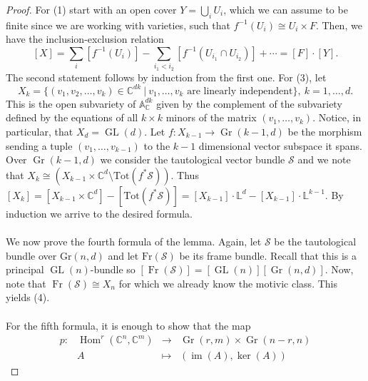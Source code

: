 \documentclass{amsart}
\theoremstyle{plain}
\numberwithin{equation}{section}
\theoremstyle{definition}
\theoremstyle{remark}
\begin{document}
	\begin{proof}
		For (1) start with an open cover $Y=\bigcup_{i}U_i$, which we can assume to be finite since we are working with varieties, such that $f^{-1}(U_i)\cong U_i\times F$. Then, we have the inclusion-exclusion relation
		$$
		[X]=\sum_{i}[f^{-1}(U_i)]-\sum_{i_1<i_2}[f^{-1}(U_{i_1}\cap U_{i_2})]+\cdots=[F]\cdot [Y].
		$$
		The second statement follows by induction from the first one. For (3), let 
		$$
		X_k=\{(v_1,v_2,\ldots,v_k)\in \mathbb{C}^{dk}\ | \ v_1,\ldots,v_k \text{ are linearly independent} \}, \ k=1,\ldots,d.
		$$
		This is the open subvariety of $\mathbb{A}^{dk}_{\mathbb{C}}$ given by the complement of the subvariety defined by the equations of all $k\times k $ minors of the matrix $(v_1,\ldots,v_k)$. Notice, in particular, that $X_d=\operatorname{GL}(d)$. Let $f:X_{k-1}\to \operatorname{Gr}(k-1,d)$ be the morphism sending a tuple $(v_1,\ldots,v_{k-1})$ to the $k-1$ dimensional vector subspace it spans.  Over $\operatorname{Gr}(k-1,d)$ we consider the tautological vector bundle $\mathcal{S}$ and we note that $X_k\cong (X_{k-1}\times \mathbb{C}^d\setminus\text{Tot}(f^*\mathcal{S}))$. Thus $[X_k]=[X_{k-1}\times \mathbb{C}^d]-[\text{Tot}(f^*\mathcal{S})]=[X_{k-1}]\cdot\mathbb{L}^d-[X_{k-1}]\cdot \mathbb{L}^{k-1}$. By induction we arrive to the desired formula. 
		\\
		\\
		We now prove the fourth formula of the lemma. Again, let $\mathcal{S}$ be the tautological bundle over $\text{Gr}(n,d)$ and let $\text{Fr}(\mathcal{S})$ be its frame bundle. Recall that this is a principal $\operatorname{GL}(n)$-bundle so $[\operatorname{Fr}(\mathcal{S})]=[\operatorname{GL}(n)][\operatorname{Gr}(n,d)]$. Now, note that $\operatorname{Fr}(\mathcal{S})\cong X_n$ for which we already know the motivic class. This yields (4).
		\\
		\\
		For the fifth formula, it is enough to show that the map
		\begin{equation}\label{mapSendingMatrixToKerAndImage}
		\begin{matrix}
		p: & \operatorname{Hom}^r(\mathbb{C}^n,\mathbb{C}^m) & \longrightarrow & \operatorname{Gr}(r,m)\times \operatorname{Gr}(n-r,n) \\
		&A &\longmapsto & (\operatorname{im}(A),\ker(A))
		\end{matrix}
		\end{equation}

\end{proof}
\end{document}
